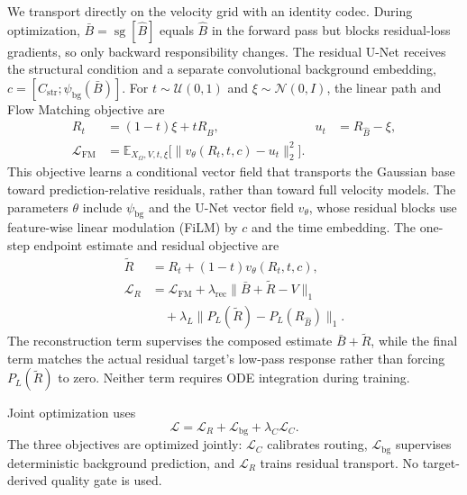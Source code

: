 We transport directly on the velocity grid with an identity codec. During optimization, $\bar B=\operatorname{sg}[\hat B]$ equals $\hat B$ in the forward pass but blocks residual-loss gradients, so only backward responsibility changes. The residual U-Net receives the structural condition and a separate convolutional background embedding, $c=[C_{\mathrm{str}};\psi_{\mathrm{bg}}(\bar B)]$. For $t\sim\mathcal U(0,1)$ and $\xi\sim\mathcal N(0,I)$, the linear path and Flow Matching objective are
\begin{equation}
\begin{aligned}
R_t&=(1-t)\xi+tR_{\hat B},&
u_t&=R_{\hat B}-\xi,\\
\mathcal L_{\mathrm{FM}}
&=\mathbb E_{X_\Omega,V,t,\xi}
\bigl[\|v_\theta(R_t,t,c)-u_t\|_2^2\bigr].
\end{aligned}
\label{eq:fm-objective}
\end{equation}
This objective learns a conditional vector field that transports the Gaussian base toward prediction-relative residuals, rather than toward full velocity models.
The parameters $\theta$ include $\psi_{\mathrm{bg}}$ and the U-Net vector field $v_\theta$, whose residual blocks use feature-wise linear modulation (FiLM) \cite{perez2018film} by $c$ and the time embedding. The one-step endpoint estimate and residual objective are
\begin{equation}
\begin{aligned}
\widetilde R
&=R_t+(1-t)v_\theta(R_t,t,c),\\
\mathcal L_R
&=\mathcal L_{\mathrm{FM}}
+\lambda_{\mathrm{rec}}\|\bar B+\widetilde R-V\|_1\\
&\quad+\lambda_{L}\|P_L(\widetilde R)-P_L(R_{\hat B})\|_1.
\end{aligned}
\label{eq:residual-loss}
\end{equation}
The reconstruction term supervises the composed estimate $\bar B+\widetilde R$, while the final term matches the actual residual target's low-pass response rather than forcing $P_L(\widetilde R)$ to zero. Neither term requires ODE integration during training.

Joint optimization uses
\begin{equation}
\mathcal L=\mathcal L_R+\mathcal L_{\mathrm{bg}}+\lambda_C\mathcal L_C.
\label{eq:total-loss}
\end{equation}
The three objectives are optimized jointly: $\mathcal L_C$ calibrates routing, $\mathcal L_{\mathrm{bg}}$ supervises deterministic background prediction, and $\mathcal L_R$ trains residual transport. No target-derived quality gate is used.


